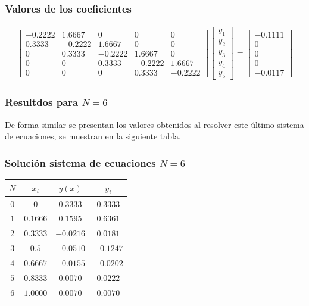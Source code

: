 \begin{frame}
\frametitle{Valores de los coeficientes}
\fontsize{10}{10}\selectfont
\begin{align*}
\begin{bmatrix}
-0.2222 & 1.6667 & 0 & 0 & 0 \\
0.3333 & -0.2222 & 1.6667 & 0 & 0 \\
0 & 0.3333 & -0.2222 & 1.6667 & 0 \\
0 & 0 & 0.3333 & -0.2222 & 1.6667 \\
0 & 0 & 0 & 0.3333 & -0.2222
\end{bmatrix}
\begin{bmatrix}
y_{1} \\
y_{2} \\
y_{3} \\
y_{4} \\
y_{5}
\end{bmatrix} =
\begin{bmatrix}
-0.1111 \\
0 \\
0 \\
0 \\
-0.0117
\end{bmatrix}
\end{align*}
\end{frame}
\begin{frame}
\frametitle{Resultdos para $N=6$}
De forma similar se presentan los valores obtenidos al resolver este último sistema de ecuaciones, se
muestran en la siguiente tabla.
\end{frame}
\begin{frame}
\frametitle{Solución sistema de ecuaciones $N=6$}
\fontsize{10}{10}\selectfont
\begin{table}
\begin{tabular}{| c | c | c | c | } \hline
$N$ & $x_{i}$ & $y(x)$ & $y_{i}$ \\\hline
$0$ & $0$ & $0.3333$ & $0.3333$ \\\hline
$1$ & $0.1666$ & $0.1595$ & $0.6361$ \\\hline
$2$ & $0.3333$ & $-0.0216$ & $0.0181$ \\\hline
$3$ & $0.5$ & $-0.0510$ & $-0.1247$ \\\hline
$4$ & $0.6667$ & $-0.0155$ & $-0.0202$ \\\hline
$5$ & $0.8333$ & $0.0070$ & $0.0222$ \\\hline
$6$ & $1.0000$ & $0.0070$ & $0.0070$ \\\hline
\end{tabular}
\end{table}
\end{frame}
